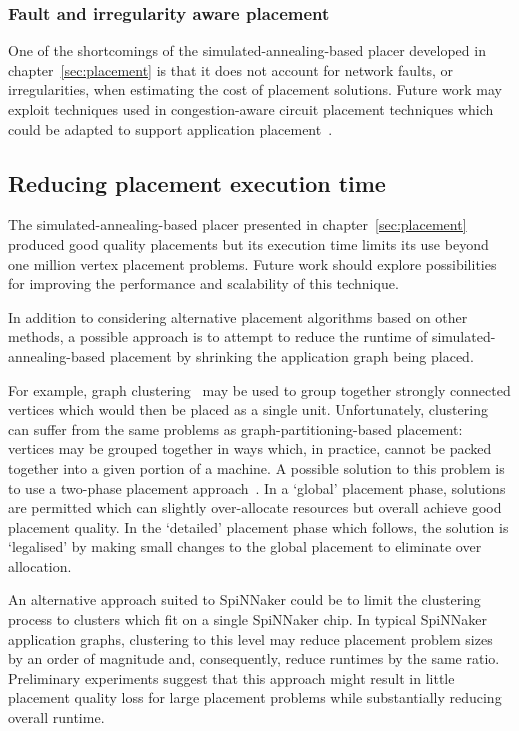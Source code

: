 			\subsubsection{Fault and irregularity aware placement}
				
				One of the shortcomings of the simulated-annealing-based placer
				developed in chapter~\ref{sec:placement} is that it does not account
				for network faults, or irregularities, when estimating the cost of
				placement solutions.  Future work may exploit techniques used in
				congestion-aware circuit placement techniques which could be adapted to
				support application placement~\cite{viswanathan07}.
		
		\subsection{Reducing placement execution time}
			
			The simulated-annealing-based placer presented in
			chapter~\ref{sec:placement} produced good quality placements but its
			execution time limits its use beyond one million vertex placement
			problems. Future work should explore possibilities for improving the
			performance and scalability of this technique.
			
			In addition to considering alternative placement algorithms based on
			other methods, a possible approach is to attempt to reduce the runtime of
			simulated-annealing-based placement by shrinking the application graph
			being placed.
			
			For example, graph clustering~\cite{schaeffer07} may be used to group
			together strongly connected vertices which would then be placed as a
			single unit.  Unfortunately, clustering can suffer from the same problems
			as graph-partitioning-based placement: vertices may be grouped together
			in ways which, in practice, cannot be packed together into a given portion
			of a machine.  A possible solution to this problem is to use a two-phase
			placement approach~\cite{kahng11}. In a `global' placement phase,
			solutions are permitted which can slightly over-allocate resources but
			overall achieve good placement quality. In the `detailed' placement phase
			which follows, the solution is `legalised' by making small changes to the
			global placement to eliminate over allocation.
			
			An alternative approach suited to SpiNNaker could be to limit the
			clustering process to clusters which fit on a single SpiNNaker chip. In
			typical SpiNNaker application graphs, clustering to this level may reduce
			placement problem sizes by an order of magnitude and, consequently,
			reduce runtimes by the same ratio. Preliminary experiments suggest that
			this approach might result in little placement quality loss for large
			placement problems while substantially reducing overall runtime.
		
